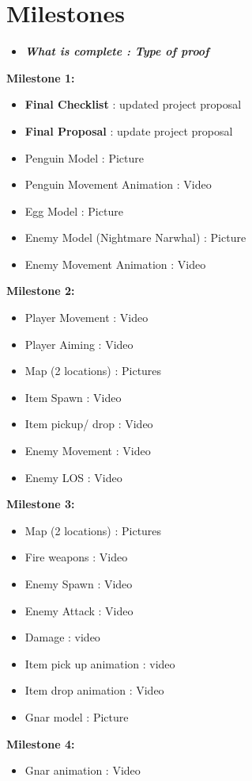 \documentclass{article}
\begin{document}
\section{Milestones}
\begin{adjustwidth}{2.5em}{0pt}
\begin{itemize}
\item \large \textbf{\textit{What is complete : Type of proof}}
\end{itemize}
\textbf{\large Milestone 1:}
\begin{itemize}
\item \textbf{Final Checklist} : updated project proposal
\item \textbf{Final Proposal} : update project proposal
\item Penguin Model : Picture
\item Penguin Movement Animation : Video
\item Egg Model : Picture
\item Enemy Model (Nightmare Narwhal) : Picture
\item Enemy Movement Animation : Video
\end{itemize}
\textbf{\large Milestone 2:}
\begin{itemize}
\item Player Movement : Video
\item Player Aiming : Video
\item Map (2 locations) : Pictures
\item Item Spawn : Video
\item Item pickup/ drop : Video
\item Enemy Movement : Video
\item Enemy LOS : Video
\end{itemize}
\textbf{\large Milestone 3:}
\begin{itemize}
\item Map (2 locations) : Pictures
\item Fire weapons : Video
\item Enemy Spawn : Video
\item Enemy Attack : Video
\item Damage : video
\item Item pick up animation : video
\item Item drop animation : Video
\item Gnar model : Picture
\end{itemize}
\textbf{\large Milestone 4:}
\begin{itemize}
\item Gnar animation : Video

\end{itemize}
\end{adjustwidth}
\end{document}
